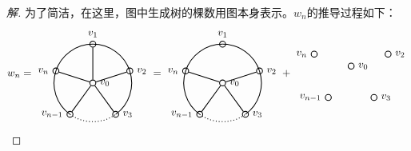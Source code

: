 \documentclass{article}
\begin{document}
\begin{CJK}{UTF8}{gbsn}
\begin{proof}[解]
 为了简洁，在这里，图中生成树的棵数用图本身表示。$w_n$的推导过程如下：
 \begin{equation*}
   w_n = \begin{tikzpicture}[auto,baseline={(current bounding box.center)},
    specification/.style ={circle, draw, thick, inner sep = 0pt, minimum size=2mm}]
    \node[specification] (A)  [label=0:$v_2$] at (18:1.3cm)  {};
   \node[specification] (B)  [label=90:$v_1$] at (90:1.3cm)  {};
   \node[specification] (C)  [label=180:$v_n$] at (162:1.3cm)  {};
   \node[specification] (D) [label=180:$v_{n-1}$] at (234:1.3cm)  {};
   \node[specification] (E)  [label=0:$v_3$] at (306:1.3cm)  {};
   \node[specification] (o)  [label=0:$v_0$] at (0,0)  {};
   
   
   
   \draw[thick] (A) to  (o);
   \draw[thick] (B) to  (o);
   \draw[thick] (C) to  (o);
   \draw[thick] (D) to  (o);
   \draw[thick] (E) to  (o);

   

   \draw[thick] (18:1.3cm) arc (18:90:1.3cm);
   \draw[thick] (90:1.3cm) arc (90:162:1.3cm);
   \draw[thick] (162:1.3cm) arc (162:234:1.3cm);

   \draw[thick,dotted] (234:1.3cm) arc (234:306:1.3cm);
   \draw[thick] (306:1.3cm) arc (-54:18:1.3cm);
 \end{tikzpicture} =
 \begin{tikzpicture}[auto,baseline={(current bounding box.center)},
    specification/.style ={circle, draw, thick, inner sep = 0pt, minimum size=2mm}]
    \node[specification] (A)  [label=0:$v_2$] at (18:1.3cm)  {};
   \node[specification] (B)  [label=90:$v_1$] at (90:1.3cm)  {};
   \node[specification] (C)  [label=180:$v_n$] at (162:1.3cm)  {};
   \node[specification] (D) [label=180:$v_{n-1}$] at (234:1.3cm)  {};
   \node[specification] (E)  [label=0:$v_3$] at (306:1.3cm)  {};
   \node[specification] (o)  [label=0:$v_0$] at (0,0)  {};
   
   
   
   
   \draw[thick] (A) to  (o);
   \draw[thick] (C) to  (o);
   \draw[thick] (D) to  (o);
   \draw[thick] (E) to  (o);

   

   \draw[thick] (18:1.3cm) arc (18:90:1.3cm);
   \draw[thick] (90:1.3cm) arc (90:162:1.3cm);
   \draw[thick] (162:1.3cm) arc (162:234:1.3cm);

   \draw[thick,dotted] (234:1.3cm) arc (234:306:1.3cm);
   \draw[thick] (306:1.3cm) arc (-54:18:1.3cm);
 \end{tikzpicture}
 +
 \begin{tikzpicture}[auto,baseline={(current bounding box.center)},
    specification/.style ={circle, draw, thick, inner sep = 0pt, minimum size=2mm}]
    \node[specification] (A)  [label=0:$v_2$] at (18:1.3cm)  {};
   \node[specification] (C)  [label=180:$v_n$] at (162:1.3cm)  {};
   \node[specification] (D) [label=180:$v_{n-1}$] at (234:1.3cm)  {};
   \node[specification] (E)  [label=0:$v_3$] at (306:1.3cm)  {};
   \node[specification] (o)  [label=0:$v_0$] at (0,0)  {};
   

\end{tikzpicture}
\end{equation*}
\end{proof}
\end{CJK}
\end{document}
